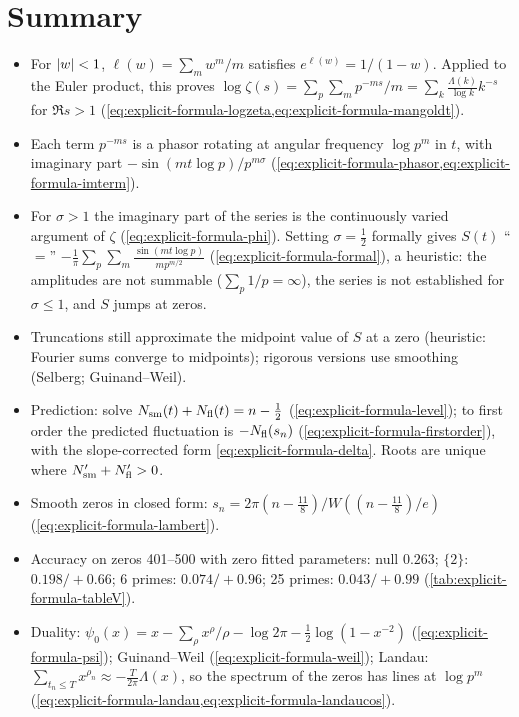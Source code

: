\section{Summary}\label{sec:explicit-formula-summary}
\begin{itemize}
\item For $\left\lvert w\right\rvert<1$, $\ell(w)=\sum_m w^m/m$ satisfies $e^{\ell(w)}=1/(1-w)$. Applied to the Euler product, this proves $\log\zeta(s)=\sum_p\sum_m p^{-ms}/m=\sum_k\frac{\Lambda(k)}{\log k}k^{-s}$ for $\Re s>1$ (\cref{eq:explicit-formula-logzeta,eq:explicit-formula-mangoldt}).
\item Each term $p^{-ms}$ is a phasor rotating at angular frequency $\log p^m$ in $t$, with imaginary part $-\sin(mt\log p)/p^{m\sigma}$ (\cref{eq:explicit-formula-phasor,eq:explicit-formula-imterm}).
\item For $\sigma>1$ the imaginary part of the series is the continuously varied argument of $\zeta$ (\cref{eq:explicit-formula-phi}). Setting $\sigma=\frac12$ formally gives $S(t)$ ``$=$'' $-\frac1\pi\sum_p\sum_m\frac{\sin(mt\log p)}{mp^{m/2}}$ (\cref{eq:explicit-formula-formal}), a heuristic: the amplitudes are not summable ($\sum_p1/p=\infty$), the series is not established for $\sigma\le1$, and $S$ jumps at zeros.
\item Truncations still approximate the midpoint value of $S$ at a zero (heuristic: Fourier sums converge to midpoints); rigorous versions use smoothing (Selberg; Guinand--Weil).
\item Prediction: solve $N_{\mathrm{sm}}(t)+N_{\mathrm{fl}}(t)=n-\frac12$ (\cref{eq:explicit-formula-level}); to first order the predicted fluctuation is $-N_{\mathrm{fl}}(s_n)$ (\cref{eq:explicit-formula-firstorder}), with the slope-corrected form \cref{eq:explicit-formula-delta}. Roots are unique where $N_{\mathrm{sm}}'+N_{\mathrm{fl}}'>0$.
\item Smooth zeros in closed form: $s_n=2\pi(n-\frac{11}8)/W((n-\frac{11}8)/e)$ (\cref{eq:explicit-formula-lambert}).
\item Accuracy on zeros 401--500 with zero fitted parameters: null $0.263$; $\{2\}$: $0.198/+0.66$; 6 primes: $0.074/+0.96$; 25 primes: $0.043/+0.99$ (\cref{tab:explicit-formula-tableV}).
\item Duality: $\psi_0(x)=x-\sum_\rho x^\rho/\rho-\log2\pi-\frac12\log(1-x^{-2})$ (\cref{eq:explicit-formula-psi}); Guinand--Weil (\cref{eq:explicit-formula-weil}); Landau: $\sum_{t_n\le T}x^{\rho_n}\approx-\frac{T}{2\pi}\Lambda(x)$, so the spectrum of the zeros has lines at $\log p^m$ (\cref{eq:explicit-formula-landau,eq:explicit-formula-landaucos}).
\end{itemize}

